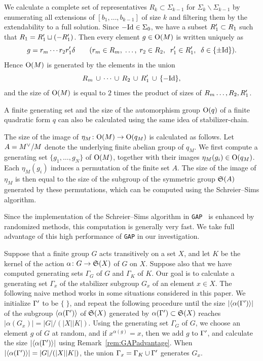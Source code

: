 \documentclass{amsart} %
\begin{document}
We calculate a complete set of representatives
$R_k \subset \Sigma_{k-1}$ for $\Sigma_{k}\backslash\Sigma_{k-1}$
by enumerating all extensions of $[b_1, \dots, b_{k-1}]$ of size $k$
and filtering them by the extendability to a full solution.
Since $-\mathord{\mathrm{Id}}\in \Sigma_0$,
we have a subset $R_1^{\prime} \subset R_1$ such that
$R_1=R_1^{\prime}\sqcup (-R_1^{\prime})$.
Then every element $g\in \mathord{\mathrm{O}}(M)$ 
is written uniquely as 
\[
g=r_m \cdots r_2 r_1^{\prime} \delta \qquad
 (r_m\in R_m,\;  \dots, \; r_2\in R_2, \;\; r_1^{\prime}\in R_1^{\prime},\;\;  \delta\in \{\pm \mathord{\mathrm{Id}}\}).
\]
Hence $\mathord{\mathrm{O}}(M)$ is generated by the elements in the union 
\[
R_m\, \cup\, \cdots\,  \cup \,R_2\,\cup\, R_1^{\prime}\,\cup\,  \{- \mathord{\mathrm{Id}}\},
\]
and 
the size  of $\mathord{\mathrm{O}}(M)$ is equal to $2$ times  the product of sizes of $R_m\dots, R_2, R_1^{\prime}$.
\par
A finite generating set and the size of the automorphism group $\mathord{\mathrm{O}}(q)$ of a finite quadratic form 
$q$ can also be calculated using the same idea of stabilizer-chain.
\par
The size of the image of $\eta_M\colon \mathord{\mathrm{O}}(M)\to \mathord{\mathrm{O}}(q_M)$ is calculated as follows.
Let $A=M^{\vee}/M$ denote the underlying finite abelian group of $q_M$.
We first compute a generating set $\{g_1, \dots, g_N\}$ of $\mathord{\mathrm{O}}(M)$,
together with their images $\eta_M(g_i)\in \mathord{\mathrm{O}}(q_M)$.
Each $\eta_M(g_i)$ induces a permutation of the finite set $A$.
The size of the image of $\eta_M$ is 
then equal to the size of the subgroup of 
the symmetric group $\mathord{\mathfrak{S}}(A)$ generated by these permutations,
which can be computed using the Schreier--Sims algorithm.
%
\begin{remark}\label{rem:GAPadvantage}
Since the implementation of the Schreier--Sims algorithm in {\tt GAP}~\cite{GAP4} is enhanced by randomized methods,
this computation is generally very fast.
We take full advantage of this high performance of {\tt GAP} in our investigation.
\end{remark}
%
\begin{remark}\label{rem:gensofstab}
Suppose that a finite group $G$ acts  transitively on a set $X$,
and let $K$ be the kernel of the action $\alpha\colon G\to \mathord{\mathfrak{S}}(X)$
 of $G$ on $X$.
Suppose also that we have computed  generating sets $\Gamma_G$ of $G$ and 
 $\Gamma_K$ of $K$.
Our goal is  to calculate a generating set $\Gamma_x$ of the stabilizer subgroup $G_x$ of 
an element $x\in X$.
The following naive method works in some situations considered in this paper.
We initialize  $\Gamma^{\prime}$ to be $\{\;\}$,
and repeat the following procedure until
the size $| \langle {\alpha(\Gamma^{\prime})} \rangle|$ 
of the subgroup $\langle {\alpha(\Gamma^{\prime})} \rangle$ of $\mathord{\mathfrak{S}}(X)$ 
generated by $\alpha(\Gamma^{\prime}) \subset \mathord{\mathfrak{S}}(X)$
 reaches $|\alpha(G_x)|=|G|/(|X| |K|)$.
 Using the generating  set $\Gamma_G$ of $G$, 
 we choose an element $g$ of $G$ at random, and 
if  $x^{\alpha(g)}=x$,  then we add $g$ to $\Gamma^{\prime}$, 
 and calculate the size $| \langle {\alpha(\Gamma^{\prime})} \rangle|$ using Remark~\ref{rem:GAPadvantage}.
 When $| \langle {\alpha(\Gamma^{\prime})} \rangle|=|G|/(|X| |K|)$, 
the union  $\Gamma_x=\Gamma_K\cup \Gamma^{\prime}$ generates $G_x$.
\end{remark}
%
\end{document}
